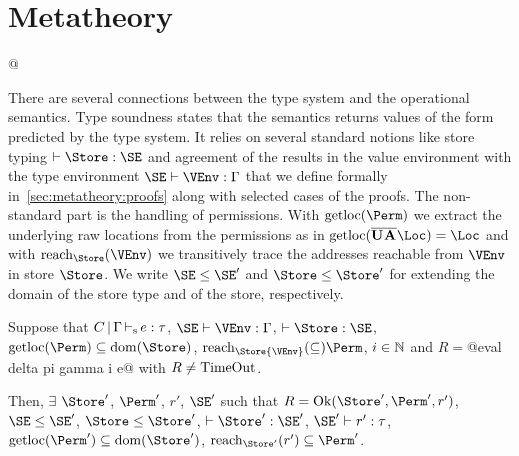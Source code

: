 \section{Metatheory}
\label{sec:metatheory}

\lstMakeShortInline[style=rule]@

There are several connections between the type system and
the operational semantics. Type soundness states
that the semantics returns values of the form predicted by the type
system. It relies on several standard notions like store typing
$\vdash \Store : \SE$ and agreement of the results in the value environment
with the type environment $\SE \vdash \VEnv:\E$ that we define
formally in~\cref{sec:metatheory:proofs} along with selected cases of the proofs. The
non-standard part is the handling of permissions. With
$\Rawloc\Perm$ we extract the underlying raw locations from the
permissions as in  $\Rawloc{\Multi\IBORROW\Multi\MBORROW\Loc} = \Loc$
and with $\Reach\Store\VEnv$ we transitively trace the 
addresses reachable from $\VEnv$ in store $\Store$. We write
$\SE\le\SE'$ and $\Store \le \Store'$ for extending the domain of the
store type and of the store, respectively.

\begin{theorem}\label{theorem:type-soundness}
  Suppose that
    $C \operatorname{|} \Gamma \operatorname{\vdash_s} e : \tau$,
    $\SE \vdash \VEnv : \E$,
    $\vdash \Store : \SE$,
    $\Rawloc\Perm \subseteq \Dom\Store$,
    $\Reach\Store{\VEnv} \subseteq \Perm$,
    $i\in\mathbb{N}$ and
    $R = $@eval delta pi gamma i e@
    with $R\ne \operatorname{TimeOut}$.

  Then,
  $\exists$ $\Store'$, $\Perm'$, $r'$, $\SE'$ such that
    $R = \Ok{\Store', \Perm', r'}$,
    $\SE \le \SE'$, $\Store \le \Store'$,
    $\vdash \Store' : \SE'$,
    $\SE' \vdash r' : \tau$,
    $\Rawloc{\Perm'} \subseteq \Dom{\Store'}$,
    $\Reach{\Store'}{r'} \subseteq \Perm'$.
\end{theorem}

